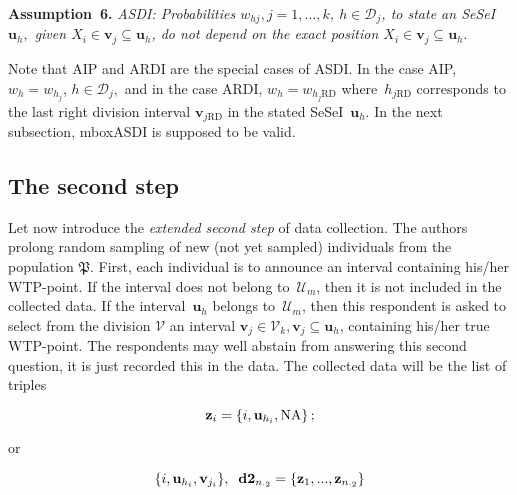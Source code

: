 \begin{multicols}{2}
\smallskip

\noindent
\textbf{Assumption~6.}
\textit{ASDI: Probabilities $w_{hj}, j=1, \ldots, k$, $h\in\mathcal{D}_j$, 
to state an SeSeI~$\mathbf{u}_h,$
 given $X_i \in \mathbf{v}_j\subseteq \mathbf{u}_h$, do not depend on the exact position 
 $X_i \in \mathbf{v}_j\subseteq \mathbf{u}_h$}.

\smallskip


Note that AIP and ARDI are the special cases of \mbox{ASDI}. In the case 
AIP, $w_{h} = w_{h_j}$, $h\in\mathcal{D}_j,$ and in the case \mbox{ARDI},
$w_{h} = w_{h_j\mathrm{RD}}$  
where~$h_{j \mathrm{RD}}$ corresponds to the last right division
interval $\mathbf{v}_{j\mathrm{RD}}$
in the stated SeSeI~$\mathbf{u}_h$. 
In the next subsection, mbox{ASDI} is supposed to be valid.

\vspace*{-6pt}

\subsection{The second step}

\vspace*{-1pt}

\noindent
  Let now introduce the \textit{extended second step\/} of data collection. The authors
  prolong  random sampling of new (not yet sampled) individuals from the population 
  $\mathfrak {P}$. First, each individual is to announce  an
interval containing his/her  WTP-point.
  If the interval does not belong to~$\mathcal{U}_m$, then it is not
  included in the collected data. If the interval~$\mathbf{u}_h$ belongs to~$\mathcal{U}_m$, then
 this respondent is asked to select  from the division
  $\mathcal{V}$  an interval $ \mathbf{v}_j\in\mathcal{V}_k, \mathbf{v}_j\subseteq 
  \mathbf{u}_h$,   containing his/her true  WTP-point.
 The respondents may well abstain from answering this second question, it is 
 just recorded this in the data.
   The collected data will be the list of triples
   
   \vspace*{2pt}
   
   \noindent
$$
 {\bf z}_i = \{i, {\bf u}_{h_i}, \mathrm{NA}\}\,;
 $$
 
 \vspace*{-2pt}
 
 \noindent
 or
 
 \vspace*{2pt}
 
 \noindent
 $$
\{ i, {\bf u}_{h_i}, {\bf v}_{j_i} \} ,\;\; {\bf d2}_{n_{\cdot 2}}=\{ {\bf z}_1, ...,
{\bf z}_{n_{\cdot 2}}\}
$$


\end{multicols}
